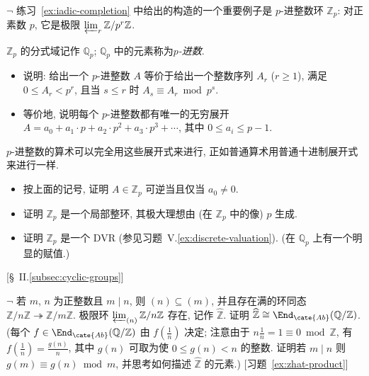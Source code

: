 \begin{prob}\label{ex:p-adic}
$\neg$ 练习~\ref{ex:iadic-completion} 中给出的构造的一个重要例子是 $p$-进整数环 $\mathbb{Z}_p$: 对正素数 $p$, 它是极限 $\varprojlim_r\mathbb{Z}/p^r\mathbb{Z}$.

$\mathbb{Z}_p$ 的分式域记作 $\mathbb{Q}_p$; $\mathbb{Q}_p$ 中的元素称为\emph{$p$-进数}.

\begin{itemize}
\item 说明: 给出一个 $p$-进整数 $A$ 等价于给出一个整数序列 $A_r$ ($r\geq 1$), 满足 $0\leq A_r<p^r$, 且当 $s\leq r$ 时 $A_s\equiv A_r\bmod p^s$.
\item 等价地, 说明每个 $p$-进整数都有唯一的无穷展开 $A=a_0+a_1\cdot p+a_2\cdot p^2+a_3\cdot p^3+\cdots$, 其中 $0\leq a_i\leq p-1$.
\end{itemize}
$p$-进整数的算术可以完全用这些展开式来进行, 正如普通算术用普通十进制展开式来进行一样.

\begin{itemize}
\item 按上面的记号, 证明 $A\in\mathbb{Z}_p$ 可逆当且仅当 $a_0\neq 0$.
\item 证明 $\mathbb{Z}_p$ 是一个局部整环, 其极大理想由 (在 $\mathbb{Z}_p$ 中的像) $p$ 生成.
\item 证明 $\mathbb{Z}_p$ 是一个 DVR (参见习题~V.\ref{ex:discrete-valuation}). (在 $\mathbb{Q}_p$ 上有一个明显的赋值.)
\end{itemize}
[\S~II.\ref{subsec:cyclic-groups}]
\end{prob}

\begin{prob}\label{ex:zhat}
$\neg$ 若 $m$, $n$ 为正整数且 $m\mid n$, 则 $(n)\subseteq(m)$, 并且存在满的环同态 $\mathbb{Z}/n\mathbb{Z}\twoheadrightarrow\mathbb{Z}/m\mathbb{Z}$. 极限环 $\varprojlim_{(n)}\mathbb{Z}/n\mathbb{Z}$ 存在, 记作 $\widehat{\mathbb{Z}}$. 证明 $\widehat{\mathbb{Z}}\cong\End_{\cate{Ab}}(\mathbb{Q}/\mathbb{Z})$. (每个 $f\in\End_{\cate{Ab}}(\mathbb{Q}/\mathbb{Z})$ 由 $f(\frac{1}{n})$ 决定; 注意由于 $n\frac{1}{n}=1\equiv 0\bmod\mathbb{Z}$, 有 $f(\frac{1}{n})=\frac{g(n)}{n}$, 其中 $g(n)$ 可取为使 $0\leq g(n)<n$ 的整数. 证明若 $m\mid n$ 则 $g(m)\equiv g(n)\bmod m$, 并思考如何描述 $\widehat{\mathbb{Z}}$ 的元素.) [习题~\ref{ex:zhat-product}]
\end{prob}

